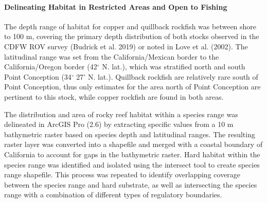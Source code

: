 \documentclass[11pt,
  english,
  a4paper,
]{article}
\begin{document}

\hypertarget{delineating-habitat-in-restricted-areas-and-open-to-fishing}{%
\paragraph{Delineating Habitat in Restricted Areas and Open to Fishing}\label{delineating-habitat-in-restricted-areas-and-open-to-fishing}}

\leavevmode\tagmcend\tagstructend


The depth range of habitat for copper and quillback rockfish was between shore to 100 m, covering the primary depth distribution of both stocks observed in the CDFW ROV survey {(Budrick et al. 2019)\leavevmode\tagmcend\tagstructend} or noted in Love et al. {(2002)\leavevmode\tagmcend\tagstructend}. The latitudinal range was set from the California/Mexican border to the California/Oregon border (42{\(^\circ\)\leavevmode\tagmcend\tagstructend} N. lat.), which was stratified north and south Point Conception (34{\(^\circ\)\leavevmode\tagmcend\tagstructend} 27' N. lat.). Quillback rockfish are relatively rare south of Point Conception, thus only estimates for the area north of Point Conception are pertinent to this stock, while copper rockfish are found in both areas.

\leavevmode\tagmcend\tagstructend\par


The distribution and area of rocky reef habitat within a species range was delineated in ArcGIS Pro (2.6) by extracting specific values from a 10 m bathymetric raster based on species depth and latitudinal ranges. The resulting raster layer was converted into a shapefile and merged with a coastal boundary of California to account for gaps in the bathymetric raster. Hard habitat within the species range was identified and isolated using the intersect tool to create species range shapefile. This process was repeated to identify overlapping coverage between the species range and hard substrate, as well as intersecting the species range with a combination of different types of regulatory boundaries.
\end{document}
